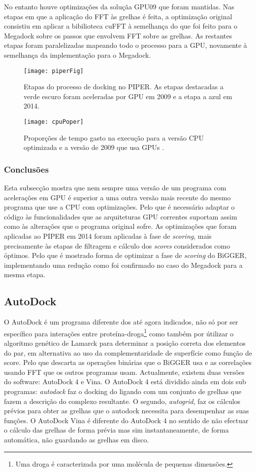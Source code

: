  No entanto houve optimizações da soluçãa GPU09 que foram mantidas. Nas etapas em que a aplicação do FFT às grelhas é feita, a optimização original consistiu em aplicar a bibilioteca cuFFT à semelhança do que foi feito para o Megadock sobre os passos que envolvem FFT sobre as grelhas. As restantes etapas foram paralelizadas mapeando todo o processo para a GPU, novamente à semelhança da implementação para o Megadock.
    \begin{figure}[ht]
  \centering
    {\texttt{[image: piperFig]}}
  \caption{Etapas do processo de docking no PIPER. As etapas destacadas a verde escuro foram aceleradas por GPU em 2009 e a etapa a azul em 2014. \cite{piper2014gpu} }
  \label{piperGPU}
\end{figure}

    \begin{figure}[ht]
  \centering
    {\texttt{[image: cpuPoper]}}
  \caption{Proporções de tempo gasto na execução para a versão CPU optimizada e a versão de 2009 que usa GPUs\cite{piper2014gpu} . }
  \label{propPiper}
\end{figure}
\subsubsection{Conclusões}
Esta subsecção mostra que nem sempre uma versão de um programa com acelerações em GPU é superior a uma outra versão mais recente do mesmo programa que use a CPU com optimizações. Pelo que é necessário adaptar o código às funcionalidades que as arquiteturas GPU correntes suportam assim como às alterações que o programa original sofre. As optimizações que foram aplicadas ao PIPER em 2014 foram aplicadas à fase de \textit{scoring}, mais precisamente às etapas de filtragem e cálculo dos \textit{scores} considerados como óptimos. Pelo que é mostrado forma de optimizar a fase de \textit{scoring} do BiGGER, implementando uma redução como foi confirmado no caso do Megadock para a mesma etapa.
\subsection {AutoDock}
O AutoDock \cite{autoDock} é um programa diferente dos até agora indicados, não só por ser específico para interações entre proteína-droga\footnote[10]{Uma droga é caracterizada  por uma molécula de pequenas dimensões.} como também por útilizar o algoritmo genético de Lamarck para determinar a posição correta dos elementos do par, em alternativa ao uso da complementaridade de superfície como função de score. Pelo que descarta as operações binárias que o BiGGER usa e as correlações usando FFT que os outros programas usam.
Actualmente, existem duas versões do software: AutoDock 4 e Vina\cite{autoDockVina}. O AutoDock 4 está dividido ainda em dois sub programas: \textit{autodock} faz o docking do ligando com um conjunto de grelhas que fazem a descrição do complexo resultante. O segundo, \textit{autogrid}, faz os cálculos prévios para obter as grelhas que o autodock necessita para desempenhar as suas funções.  
O AutoDock Vina é diferente do AutoDock 4 no sentido de não efectuar o cálculo das grelhas de forma prévia mas sim instantaneamente, de forma automática, não guardando as grelhas em disco.
